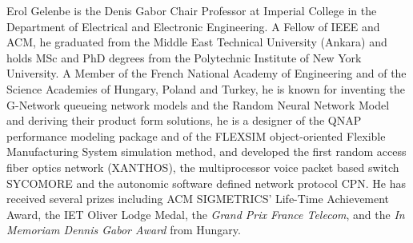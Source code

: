 \documentclass[journal]{IEEEtran}
\begin{document}

\begin{biographynophoto}{Erol Gelenbe}
is the Denis Gabor Chair Professor at Imperial College in the Department of Electrical and Electronic Engineering. A Fellow of IEEE and ACM, he graduated from the Middle East Technical University (Ankara) and holds MSc and PhD degrees from the Polytechnic Institute of New York University. A Member of the French National Academy of Engineering and of the Science Academies of Hungary, Poland and Turkey, he is known for inventing the G-Network queueing network models and the Random Neural Network Model and deriving their product form solutions, he is a designer of the QNAP performance modeling package and of the FLEXSIM object-oriented Flexible Manufacturing System simulation method, and developed the first random access fiber optics network (XANTHOS), the multiprocessor voice packet based switch SYCOMORE and the autonomic software defined network protocol CPN.  He has received several prizes including ACM SIGMETRICS' Life-Time Achievement Award, the IET Oliver Lodge Medal, the {\em Grand Prix France Telecom}, and the {\em In Memoriam Dennis Gabor Award} from Hungary.
\end{biographynophoto}
\end{document}
